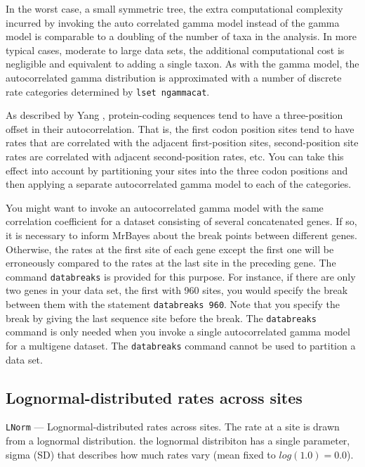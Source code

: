 \documentclass[12pt]{book}
\newcommand{\ttt}[1]{\texttt{#1}}
\begin{document}
In the worst case, a small symmetric tree, the extra computational complexity incurred by invoking
the auto correlated gamma model instead of the gamma model is comparable to a doubling of the
number of taxa in the analysis. In more typical cases, moderate to large data sets, the additional
computational cost is negligible and equivalent to adding a single taxon. As with the gamma model,
the autocorrelated gamma distribution is approximated with a number of discrete rate categories
determined by \ttt{lset ngammacat}.

As described by Yang \citep{yang95a}, protein-coding sequences tend to have a three-position offset
in their autocorrelation. That is, the first codon position sites tend to have rates that are
correlated with the adjacent first-position sites, second-position site rates are correlated with
adjacent second-position rates, etc. You can take this effect into account by partitioning your
sites into the three codon positions and then applying a separate autocorrelated gamma model to
each of the categories.

You might want to invoke an autocorrelated gamma model with the same correlation coefficient for a
dataset consisting of several concatenated genes. If so, it is necessary to inform MrBayes about
the break points between different genes. Otherwise, the rates at the first site of each gene
except the first one will be erroneously compared to the rates at the last site in the preceding
gene. The command \ttt{databreaks} is provided for this purpose. For instance, if there are only
two genes in your data set, the first with 960 sites, you would specify the break between them with
the statement \ttt{databreaks 960}. Note that you specify the break by giving the last sequence
site before the break. The \ttt{databreaks} command is only needed when you invoke a single
autocorrelated gamma model for a multigene dataset. The \ttt{databreaks} command cannot be used to
partition a data set.

\subsection{Lognormal-distributed rates across sites}
\ttt{LNorm} --- Lognormal-distributed rates across sites. The rate at a site is drawn from a
lognormal distribution. the lognormal distribiton has a single parameter, sigma (SD) that describes
how much rates vary (mean fixed to $log(1.0) = 0.0$).

\end{document}
